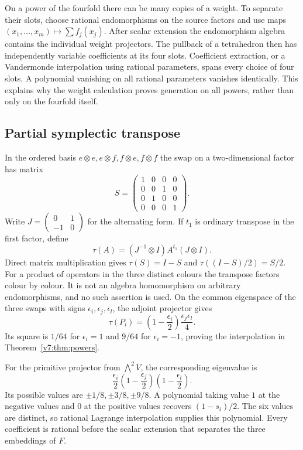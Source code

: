On a power of the fourfold there can be many copies of a weight.
To separate their slots, choose rational endomorphisms on the source
factors and use maps $(x_1,\ldots,x_m)\mapsto\sum f_j(x_j)$.
After scalar extension the endomorphism algebra contains the
individual weight projectors. The pullback of a tetrahedron then
has independently variable coefficients at its four slots.
Coefficient extraction, or a Vandermonde interpolation using rational
parameters, spans every choice of four slots. A polynomial vanishing
on all rational parameters vanishes identically. This explains why
the weight calculation proves generation on all powers, rather than
only on the fourfold itself.

\subsection{Partial symplectic transpose}

In the ordered basis $e\otimes e,e\otimes f,f\otimes e,f\otimes f$
the swap on a two-dimensional factor has matrix
\[
 S=\begin{pmatrix}1&0&0&0\\0&0&1&0\\0&1&0&0\\0&0&0&1\end{pmatrix}.
\]
Write $J=\left(\begin{smallmatrix}0&1\\-1&0\end{smallmatrix}\right)$
for the alternating form. If $t_1$ is ordinary transpose in the first
factor, define
\[
 \tau(A)=(J^{-1}\otimes I)A^{t_1}(J\otimes I).
\]
Direct matrix multiplication gives $\tau(S)=I-S$ and
$\tau((I-S)/2)=S/2$. For a product of operators in the three distinct
colours the transpose factors colour by colour. It is not an algebra
homomorphism on arbitrary endomorphisms, and no such assertion is used.
On the common eigenspace of the three swaps with signs
$\epsilon_i,\epsilon_j,\epsilon_l$, the adjoint projector gives
\[
 \tau(P_i)=\left(1-\frac{\epsilon_i}{2}\right)
            \frac{\epsilon_j\epsilon_l}{4}.
\]
Its square is $1/64$ for $\epsilon_i=1$ and $9/64$ for
$\epsilon_i=-1$, proving the interpolation in
Theorem~\ref{v7:thm:powers}.

For the primitive projector from $\bigwedge^2V$, the corresponding
eigenvalue is
\[
 \frac{\epsilon_i}{2}
  \left(1-\frac{\epsilon_j}{2}\right)
  \left(1-\frac{\epsilon_l}{2}\right).
\]
Its possible values are $\pm1/8,\pm3/8,\pm9/8$.
A polynomial taking value $1$ at the negative values and $0$ at the
positive values recovers $(1-s_i)/2$. The six values are distinct,
so rational Lagrange interpolation supplies this polynomial. Every
coefficient is rational before the scalar extension that separates
the three embeddings of $F$.

